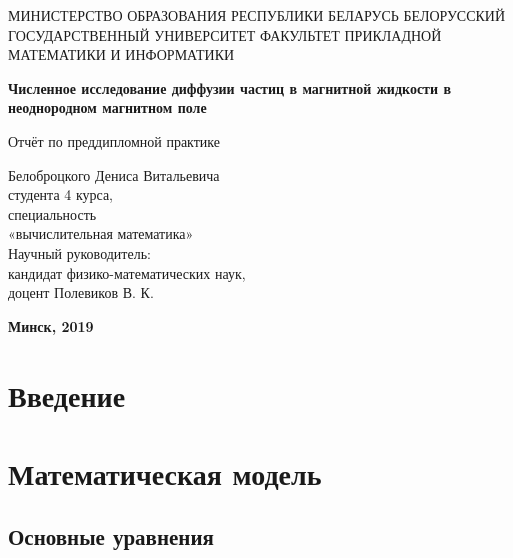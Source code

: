 \documentclass[12pt]{article}
\begin{document}
    \begin{titlepage}

        \begin{center}
            МИНИСТЕРСТВО ОБРАЗОВАНИЯ РЕСПУБЛИКИ БЕЛАРУСЬ  БЕЛОРУССКИЙ ГОСУДАРСТВЕННЫЙ УНИВЕРСИТЕТ
            ФАКУЛЬТЕТ ПРИКЛАДНОЙ МАТЕМАТИКИ И ИНФОРМАТИКИ
        \end{center}

        \vspace{1cm}

        \begin{center}
            \textbf{Численное исследование диффузии частиц в магнитной жидкости в неоднородном магнитном поле}
        \end{center}

        \vspace{1cm}

        \begin{center}
            Отчёт по преддипломной практике
        \end{center}

        \vfill

        \begin{flushright}

            Белоброцкого Дениса Витальевича\\
            студента 4 курса,\\
            специальность\\
            «вычислительная математика»\\
            Научный руководитель:\\
            кандидат физико-математических наук,\\
            доцент Полевиков В. К.\\

        \end{flushright}

        \vspace{1cm}

        \begin{center}
            \textbf{Минск, 2019}
        \end{center}

    \end{titlepage}

\newpage

\tableofcontents

\newpage

\section{Введение}

\newpage

\section{Математическая модель}

\subsection{Основные уравнения}
\end{document}

